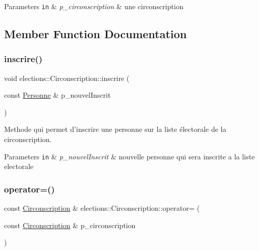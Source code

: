 \begin{DoxyParams}[1]{Parameters}
\mbox{\tt in}  & {\em p\+\_\+circonscription} & une circonscription \\
\hline
\end{DoxyParams}


\subsection{Member Function Documentation}
\mbox{\label{classelections_1_1Circonscription_a808d1495bfb8dda4bb75114d3387d35b}} 
\subsubsection{\texorpdfstring{inscrire()}{inscrire()}}
{\footnotesize\ttfamily void elections\+::\+Circonscription\+::inscrire (\begin{DoxyParamCaption}\item[{const \hyperlink{classelections_1_1Personne}{Personne} \&}]{p\+\_\+nouvel\+Inscrit }\end{DoxyParamCaption})}



Methode qui permet d’inscrire une personne sur la liste électorale de la circonscription. 


\begin{DoxyParams}[1]{Parameters}
\mbox{\tt in}  & {\em p\+\_\+nouvel\+Inscrit} & nouvelle personne qui sera inscrite a la liste electorale \\
\hline
\end{DoxyParams}
\mbox{\label{classelections_1_1Circonscription_ab61ae982ba5f251ee1ac20bd660498b1}} 
\subsubsection{\texorpdfstring{operator=()}{operator=()}}
{\footnotesize\ttfamily const \hyperlink{classelections_1_1Circonscription}{Circonscription} \& elections\+::\+Circonscription\+::operator= (\begin{DoxyParamCaption}\item[{const \hyperlink{classelections_1_1Circonscription}{Circonscription} \&}]{p\+\_\+circonscription }\end{DoxyParamCaption})}



